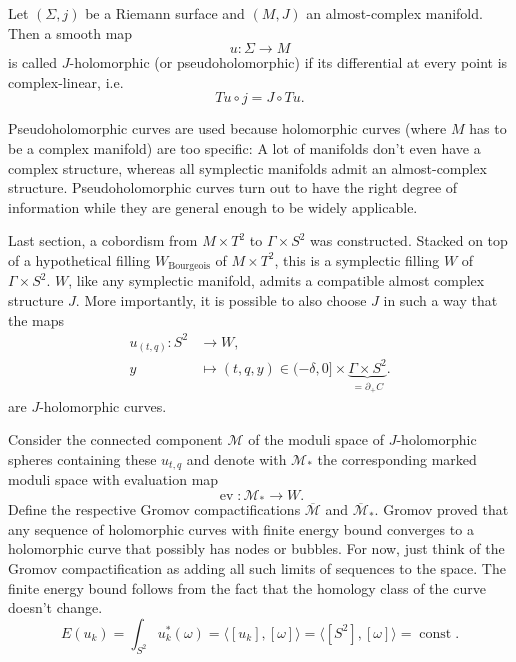 \begin{definition}
    Let $(\Sigma, j)$ be a Riemann surface and $(M, J)$ an almost-complex manifold. Then a smooth map
    \[
        u \colon \Sigma \to M
    \]
    is called $J$-holomorphic (or pseudoholomorphic) if its differential at every point is complex-linear, i.e.
    \[
        Tu \circ j = J \circ Tu.
    \]
\end{definition}

Pseudoholomorphic curves are used because holomorphic curves (where $M$ has to be a complex manifold) are too specific: 
A lot of manifolds don't even have a complex structure, whereas all symplectic manifolds admit an almost-complex structure.
Pseudoholomorphic curves turn out to have the right degree of information while they are general enough to be widely applicable.

%

Last section, a cobordism from $M\times T^2$ to $\Gamma \times S^2$ was constructed.
Stacked on top of a hypothetical filling $W_\text{Bourgeois}$ of $M\times T^2$, this is a symplectic filling $W$ of $\Gamma \times S^2$.
$W$, like any symplectic manifold, admits a compatible almost complex structure $J$.
More importantly, it is possible to also choose $J$ in such a way that the maps
\begin{align*}
    u_{(t,q)} \colon S^2 &\to W,\\
    y &\mapsto (t, q, y) \in (-\delta, 0] \times \underbrace{\Gamma \times S^2}_{= \partial_+ C}.
\end{align*}
are $J$-holomorphic curves.

Consider the connected component $\mathcal{M}$ of the moduli space of $J$-holomorphic spheres containing these $u_{t,q}$
and denote with $\mathcal{M}_*$ the corresponding marked moduli space with evaluation map
\[
    \operatorname{ev}\colon \mathcal{M}_* \to W.
\]
Define the respective Gromov compactifications $\overline{\mathcal{M}}$ and $\overline{\mathcal{M}}_*$.
Gromov proved that any sequence of holomorphic curves with finite energy bound converges to a
holomorphic curve that possibly has nodes or bubbles.
For now, just think of the Gromov compactification as adding all such limits of sequences to the space.
The finite energy bound follows from the fact that the homology class of the curve doesn't change.
\[
    E(u_k) = \int_{S^2} u_k^*(\omega) = \langle [u_k], [\omega] \rangle = \langle [S^2], [\omega]\rangle = \operatorname{const}.
\]

